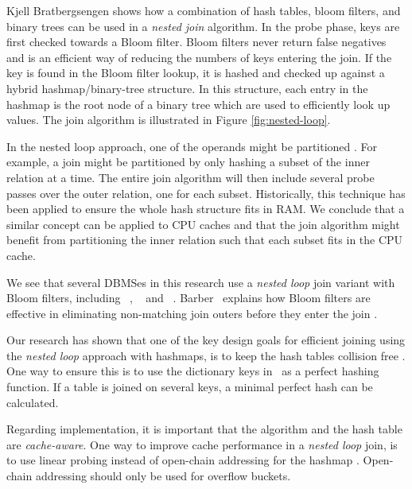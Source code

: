 Kjell Bratbergsengen shows how a combination of hash tables, bloom filters, and binary trees can be used in a \textit{nested join} algorithm. In the probe phase, keys are first checked towards a Bloom filter. Bloom filters never return false negatives and is an efficient way of reducing the numbers of keys entering the join. If the key is found in the Bloom filter lookup, it is hashed and checked up against a hybrid hashmap/binary-tree structure. In this structure, each entry in the hashmap is the root node of a binary tree which are used to efficiently look up values. The join algorithm is illustrated in Figure \ref{fig:nested-loop}.

In the nested loop approach, one of the operands might be partitioned \cite{Bratbergsengen2015-ed}. For example, a join might be partitioned by only hashing a subset of the inner relation at a time. The entire join algorithm will then include several probe passes over the outer relation, one for each subset. Historically, this technique has been applied to ensure the whole hash structure fits in RAM. We conclude that a similar concept can be applied to CPU caches and that the join algorithm might benefit from partitioning the inner relation such that each subset fits in the CPU cache.

We see that several DBMSes in this research use a \textit{nested loop} join variant with Bloom filters, including \oracle~\cite{Lahiri2015-mz}, \ibm~\cite{Raman2013-em} and \blink~\cite{Raman2008-gi}. Barber \ea~explains how Bloom filters are effective in eliminating non-matching join outers before they enter the join \cite{Barber2014-ey}.

Our research has shown that one of the key design goals for efficient joining using the \textit{nested loop} approach with hashmaps, is to keep the hash tables collision free \cite{Raman2008-gi, Raman2013-em}. One way to ensure this is to use the dictionary keys in \de~as a perfect hashing function. If a table is joined on several keys, a minimal perfect hash can be calculated.

Regarding implementation, it is important that the algorithm and the hash table are \textit{cache-aware}. One way to improve cache performance in a \textit{nested loop} join, is to use linear probing instead of open-chain addressing for the hashmap \cite{Raman2008-gi}. Open-chain addressing should only be used for overflow buckets.

